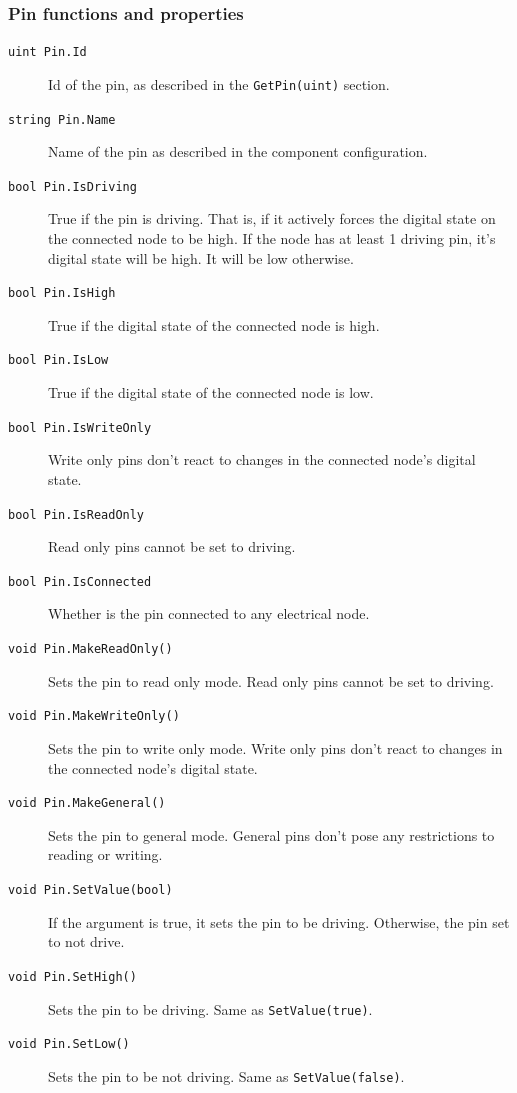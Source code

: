 \subsubsection{Pin functions and properties}
\begin{description}
    \item[\texttt{uint Pin.Id}]
    Id of the pin, as described in the \texttt{GetPin(uint)} section.

    \item[\texttt{string Pin.Name}]
    Name of the pin as described in the component configuration.

    \item[\texttt{bool Pin.IsDriving}]
    True if the pin is driving. That is, if it actively forces the digital state on the connected node to be high. If the node has at least 1 driving pin, it's digital state will be high. It will be low otherwise.

    \item[\texttt{bool Pin.IsHigh}]
    True if the digital state of the connected node is high.

    \item[\texttt{bool Pin.IsLow}]
    True if the digital state of the connected node is low.

    \item[\texttt{bool Pin.IsWriteOnly}]
    Write only pins don't react to changes in the connected node's digital state.

    \item[\texttt{bool Pin.IsReadOnly}]
    Read only pins cannot be set to driving.

    \item[\texttt{bool Pin.IsConnected}]
    Whether is the pin connected to any electrical node.

    \item[\texttt{void Pin.MakeReadOnly()}]
    Sets the pin to read only mode. Read only pins cannot be set to driving.

    \item[\texttt{void Pin.MakeWriteOnly()}]
    Sets the pin to write only mode. Write only pins don't react to changes in the connected node's digital state.

    \item[\texttt{void Pin.MakeGeneral()}]
    Sets the pin to general mode. General pins don't pose any restrictions to reading or writing.

    \item[\texttt{void Pin.SetValue(bool)}]
    If the argument is true, it sets the pin to be driving. Otherwise, the pin set to not drive.

    \item[\texttt{void Pin.SetHigh()}]
    Sets the pin to be driving. Same as \texttt{SetValue(true)}.

    \item[\texttt{void Pin.SetLow()}]
    Sets the pin to be not driving. Same as \texttt{SetValue(false)}.
\end{description}

